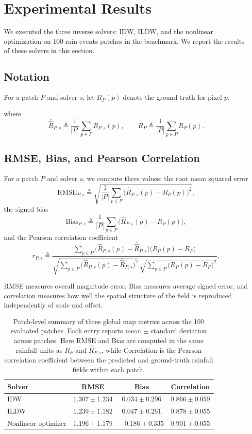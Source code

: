 \section{Experimental Results}
We executed the three inverse solvers: IDW, ILDW, and the nonlinear optimization on $100$ rain-events patches in the benchmark.
We report the results of these solvers in this section. 

\subsection{Notation}
For a patch $P$ and solver $s$, let
$R_P(p)$ denote the ground-truth for pixel $p$. 

where
\[
\overline{\widehat{R}}_{P,s}\triangleq \frac{1}{|P|}\sum_{p\in P}\widehat{R}_{P,s}(p),
\qquad
\overline{R}_P\triangleq \frac{1}{|P|}\sum_{p\in P}R_P(p).
\]

\subsection{RMSE, Bias, and Pearson Correlation}
For a patch $P$ and solver $s$, we  compute three values: the root mean squared error
\[
\mathrm{RMSE}_{P,s}\triangleq
\sqrt{\frac{1}{|P|}\sum_{p\in P}\bigl(\widehat{R}_{P,s}(p)-R_P(p)\bigr)^2},
\]
the signed bias
\[
\mathrm{Bias}_{P,s}\triangleq
\frac{1}{|P|}\sum_{p\in P}\bigl(\widehat{R}_{P,s}(p)-R_P(p)\bigr),
\]
and the Pearson correlation coefficient
\[
r_{P,s}\triangleq
\frac{\sum_{p\in P}\bigl(\widehat{R}_{P,s}(p)-\overline{\widehat{R}}_{P,s}\bigr)\bigl(R_P(p)-\overline{R}_P\bigr)}
{\sqrt{\sum_{p\in P}\bigl(\widehat{R}_{P,s}(p)-\overline{\widehat{R}}_{P,s}\bigr)^2}\,
\sqrt{\sum_{p\in P}\bigl(R_P(p)-\overline{R}_P\bigr)^2}},
\]

RMSE measures overall magnitude error. Bias measures average signed error, and correlation measures how well the spatial structure of the field is reproduced independently of scale and offset.

\begin{table}[!htbp]
  \centering
  \begin{tabular}{lccc}
    \toprule
    Solver & RMSE & Bias & Correlation \\
    \midrule
    IDW & $1.307 \pm 1.234$ & $0.034 \pm 0.296$ & $0.866 \pm 0.059$ \\
    ILDW & $1.239 \pm 1.182$ & $0.047 \pm 0.261$ & $0.878 \pm 0.055$ \\
    Nonlinear optimizer & $1.196 \pm 1.179$ & $-0.186 \pm 0.335$ & $0.901 \pm 0.055$ \\
    \bottomrule
  \end{tabular}
  \caption{Patch-level summary of three global map metrics across the 100 evaluated patches. Each entry reports mean $\pm$ standard deviation across patches. Here RMSE and Bias are computed in the same rainfall units as $R_P$ and $\widehat{R}_{P,s}$, while Correlation is the Pearson correlation coefficient between the predicted and ground-truth rainfall fields within each patch.}
  \label{tab:patch_map_metrics}
\end{table}

